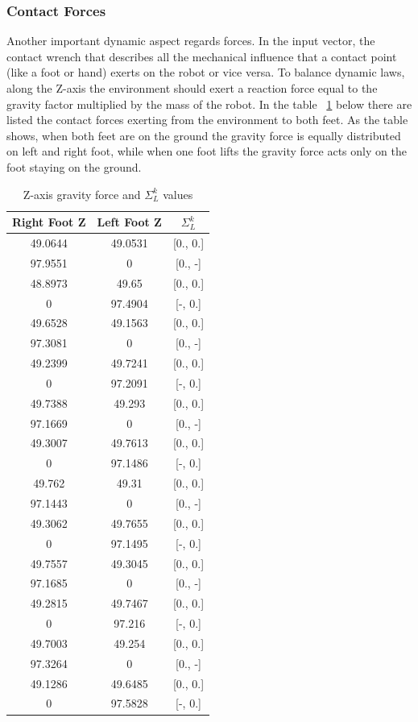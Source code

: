 \documentclass[main.tex]{subfiles}
\begin{document}
\subsubsection*{Contact Forces}
Another important dynamic aspect regards forces. 
In the input vector, the contact wrench that describes all the mechanical influence that a contact point (like a foot or hand) exerts on the robot or vice versa.
To balance dynamic laws, along the Z-axis the environment should exert a reaction force equal to the gravity factor multiplied by the mass of the robot. In the table ~\ref{tab:contact_forces_walking}  below there are listed the contact forces exerting from the environment to both feet. As the table shows, when both feet are on the ground the gravity force is equally distributed on left and right foot, while when one foot lifts the gravity force acts only on the foot staying on the ground.
\begin{table}[H]
\label{tab:contact_forces_walking}
\centering
\begin{tabular}{ccc}
\toprule
Right Foot Z & Left Foot Z & $\Sigma_L^k$ \\
\midrule
49.0644 & 49.0531 & [0., 0.] \\
97.9551 & 0 & [0., -] \\
48.8973 & 49.65 & [0., 0.] \\
0 & 97.4904 & [-, 0.] \\
49.6528 & 49.1563 & [0., 0.] \\
97.3081 & 0 & [0., -] \\
49.2399 & 49.7241 & [0., 0.] \\
0 & 97.2091 & [-, 0.] \\
49.7388 & 49.293 & [0., 0.] \\
97.1669 & 0 & [0., -] \\
49.3007 & 49.7613 & [0., 0.] \\
0 & 97.1486 & [-, 0.] \\
49.762 & 49.31 & [0., 0.] \\
97.1443 & 0 & [0., -] \\
49.3062 & 49.7655 & [0., 0.] \\
0 & 97.1495 & [-, 0.] \\
49.7557 & 49.3045 & [0., 0.] \\
97.1685 & 0 & [0., -] \\
49.2815 & 49.7467 & [0., 0.] \\
0 & 97.216 & [-, 0.] \\
49.7003 & 49.254 & [0., 0.] \\
97.3264 & 0 & [0., -] \\
49.1286 & 49.6485 & [0., 0.] \\
0 & 97.5828 & [-, 0.] \\
\bottomrule
\end{tabular}
\caption{Z-axis gravity force and $\Sigma_L^k$ values}
\end{table}
\end{document}
